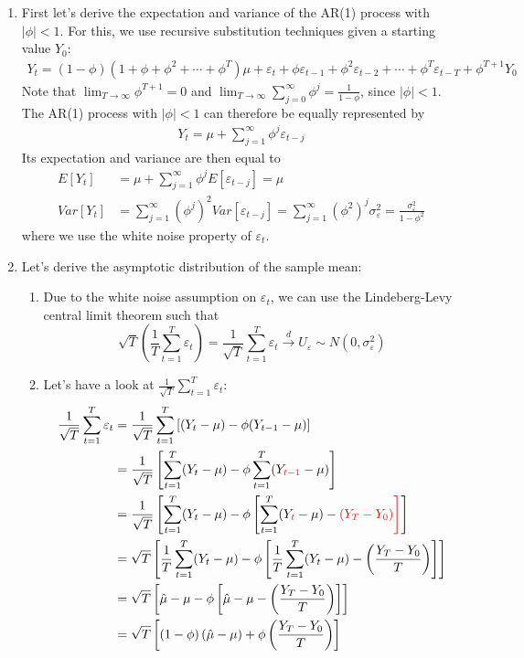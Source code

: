 \begin{enumerate}
\item
First let's derive the expectation and variance of the AR{(1)} process with \(|\phi|<1\).
For this, we use recursive substitution techniques given a starting value \(Y_0\):
\begin{align*}
Y_t = (1-\phi)(1+\phi+\phi^2+\cdots+\phi^T)\mu + \varepsilon_t + \phi \varepsilon_{t-1} + \phi^2 \varepsilon_{t-2} + \cdots + \phi^T \varepsilon_{t-T} + \phi^{T+1} Y_0
\end{align*}
Note that \(\lim_{T\rightarrow \infty} \phi^{T+1} = 0\)
  and \(\lim_{T\rightarrow \infty} \sum_{j=0}^\infty \phi^j = \frac{1}{1-\phi}\), since \(|\phi|<1\).
The AR{(1)} process with \(|\phi|<1\) can therefore be equally represented by
\begin{align*}
Y_t = \mu + \sum_{j=1}^\infty \phi^j \varepsilon_{t-j}
\end{align*}
Its expectation and variance are then equal to
\begin{align*}
E[Y_t] &= \mu + \sum_{j=1}^\infty \phi^j E[\varepsilon_{t-j}] = \mu
\\
Var[Y_t] &= \sum_{j=1}^\infty {(\phi^j)}^2 Var[\varepsilon_{t-j}] = \sum_{j=1}^\infty {(\phi^2)}^j \sigma_\varepsilon^2 = \frac{\sigma_\varepsilon^2}{1-\phi^2}
\end{align*}
where we use the white noise property of \(\varepsilon_t\).

\item
Let's derive the asymptotic distribution of the sample mean:

\begin{enumerate}
  \item
  Due to the white noise assumption on \(\varepsilon_t\),
    we can use the Lindeberg-Levy central limit theorem such that
  \begin{equation*}
  \sqrt{T} \left(\frac{1}{T} \sum_{t=1}^T \varepsilon_t \right) = \frac{1}{\sqrt{T}} \sum_{t=1}^T \varepsilon_t  \overset{d}{\rightarrow} U_\varepsilon \sim N(0,\sigma_\varepsilon^2)
  \end{equation*}
  \item
  Let's have a look at \(\frac{1}{\sqrt{T}} \sum_{t=1}^T \varepsilon_t\):
  \begin{align*}
  \frac{1}{\sqrt{T}} \sum_{t=1}^T \varepsilon_t
  &= \frac{1}{\sqrt{T}} \sum_{t=1}^T \left[(Y_t-\mu)-\phi(Y_{t-1}-\mu)\right]
  \\
  &= \frac{1}{\sqrt{T}} \left[\sum_{t=1}^T (Y_t-\mu)- \phi\sum_{t=1}^T(Y_{\color{red}{t-1}}-\mu)\right]
  \\
  &= \frac{1}{\sqrt{T}} \left[\sum_{t=1}^T (Y_t-\mu)- \phi\left[\sum_{t=1}^T(Y_{\color{red}{t}}-\mu)-\color{red}{(Y_T - Y_0)}\right]\right]
  \\
  &= \sqrt{T} \left[\frac{1}{T}\sum_{t=1}^T (Y_t-\mu)- \phi\left[\frac{1}{T}\sum_{t=1}^T(Y_{t}-\mu)-\left(\frac{Y_T - Y_0}{T}\right)\right]\right]
  \\
  &= \sqrt{T} \left[\hat{\mu}-\mu- \phi\left[\hat{\mu}-\mu-\left(\frac{Y_T - Y_0}{T}\right)\right]\right]
  \\
  &= \sqrt{T}\left[(1-\phi)\left(\hat{\mu}-\mu\right) + \phi\left(\frac{Y_T - Y_0}{T}\right)\right]
  \end{align*}


\end{enumerate}
\end{enumerate}

